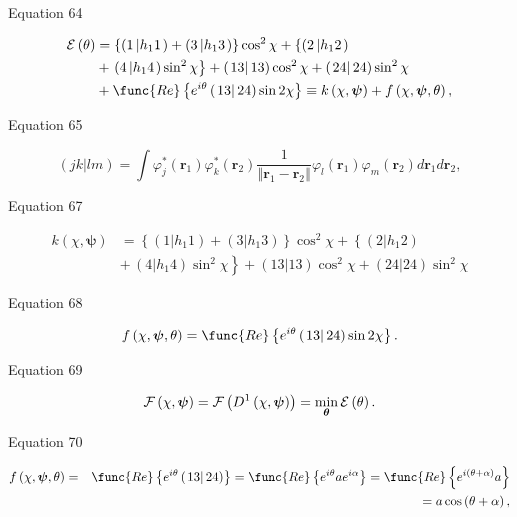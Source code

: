 \documentclass{article}
\begin{document}
Equation 64

\begin{align*}
\mathcal{E}\left( \theta \right) & =\left\{ \left( 1\left\vert h_{1}1\right.
\right) +\left( 3\left\vert h_{1}3\right. \right) \right\} \cos ^{2}\chi
+\left\{ \left( 2\left\vert h_{1}2\right. \right) \right.  \\
& +\left. \left( 4\left\vert h_{1}4\right. \right) \sin ^{2}\chi \right\}
+\left( \left. 13\right\vert 13\right) \cos ^{2}\chi +\left( \left.
24\right\vert 24\right) \sin ^{2}\chi  \\
& +\func{Re}\left\{ e^{i\theta }\left( \left. 13\right\vert 24\right) \sin
2\chi \right\} \equiv k\left( \chi ,\boldsymbol{\psi }\right) +f\left( \chi ,%
\boldsymbol{\psi },\theta \right) ,
\end{align*}

Equation 65

\[
\left( \left. jk\right\vert lm\right) =\int \varphi _{j}^{\ast }\left( 
\boldsymbol{r}_{1}\right) \varphi _{k}^{\ast }\left( \boldsymbol{r}%
_{2}\right) \frac{1}{\left\Vert \boldsymbol{r}_{1}-\boldsymbol{r}%
_{2}\right\Vert }\varphi _{l}\left( \boldsymbol{r}_{1}\right) \varphi
_{m}\left( \boldsymbol{r}_{2}\right) d\boldsymbol{r}_{1}d\boldsymbol{r}_{2},
\]

Equation 67

\begin{align*}
k\left( \chi ,\boldsymbol{\psi }\right) & =\left\{ \left( 1\left\vert
h_{1}1\right. \right) +\left( 3\left\vert h_{1}3\right. \right) \right\}
\cos ^{2}\chi +\left\{ \left( 2\left\vert h_{1}2\right. \right) \right.  \\
& \left. +\,\left( 4\left\vert h_{1}4\right. \right) \sin ^{2}\chi \right\}
+\left( \left. 13\right\vert 13\right) \cos ^{2}\chi +\left( \left.
24\right\vert 24\right) \sin ^{2}\chi 
\end{align*}

Equation 68

\[
f\left( \chi ,\boldsymbol{\psi },\theta \right) =\func{Re}\left\{ e^{i\theta
}\left( \left. 13\right\vert 24\right) \sin 2\chi \right\} .
\]

Equation 69

\[
\mathcal{F}\left( \chi ,\boldsymbol{\psi }\right) =\mathcal{F}\left(
D^{1}\left( \chi ,\boldsymbol{\psi }\right) \right) =\min_{\boldsymbol{%
\theta }}\mathcal{E}\left( \theta \right) .
\]

Equation 70

\begin{eqnarray*}
f\left( \chi ,\boldsymbol{\psi },\theta \right)  &=&\func{Re}\left\{
e^{i\theta }\left( \left. 13\right\vert 24\right) \right\} =\func{Re}\left\{
e^{i\theta }ae^{i\alpha }\right\} =\func{Re}\left\{ e^{i\left( \theta
+\alpha \right) }a\right\}  \\
&&\qquad \qquad \qquad \qquad \qquad \qquad =a\cos \left( \theta +\alpha
\right) ,
\end{eqnarray*}
\end{document}
